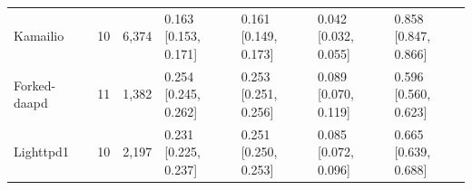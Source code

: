 \begin{table}[t]
\begin{tabularx}{\textwidth}{l r r *{4}{>{\centering\arraybackslash}X}}
Kamailio & 10 & 6,374 & \shortstack{0.163\\{[0.153, 0.171]}} & \shortstack{0.161\\{[0.149, 0.173]}} & \shortstack{0.042\\{[0.032, 0.055]}} & \shortstack{0.858\\{[0.847, 0.866]}} \\
Forked-daapd & 11 & 1,382 & \shortstack{0.254\\{[0.245, 0.262]}} & \shortstack{0.253\\{[0.251, 0.256]}} & \shortstack{0.089\\{[0.070, 0.119]}} & \shortstack{0.596\\{[0.560, 0.623]}} \\
Lighttpd1 & 10 & 2,197 & \shortstack{0.231\\{[0.225, 0.237]}} & \shortstack{0.251\\{[0.250, 0.253]}} & \shortstack{0.085\\{[0.072, 0.096]}} & \shortstack{0.665\\{[0.639, 0.688]}} \\
\bottomrule
\end{tabularx}
\end{table}
